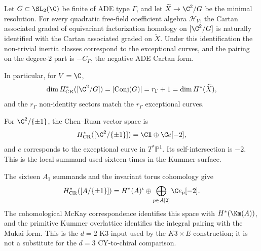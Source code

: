\begin{conjecture}
\label{conj:fh-mckay}
\ClaimStatusConjectured
Let \(G\subset \SL_2(\C)\) be finite of ADE type \(\Gamma\), and let
\(\widetilde X\to \C^2/G\) be the minimal resolution.  For every
quadratic free-field coefficient algebra \(\mathcal H_V\), the
Cartan associated graded of equivariant factorization homology on
\([\C^2/G]\) is naturally identified with the Cartan associated graded
on \(\widetilde X\).  Under this identification the non-trivial inertia
classes correspond to the exceptional curves, and the pairing on the
degree-\(2\) part is \(-C_\Gamma\), the negative ADE Cartan form.

In particular, for \(V=\C\),
\[
 \dim H^*_{\mathrm{CR}}([\C^2/G])=|\mathrm{Conj}(G)|=r_\Gamma+1
 =
 \dim H^*(\widetilde X),
\]
and the \(r_\Gamma\) non-identity sectors match the \(r_\Gamma\)
exceptional curves.
\end{conjecture}

\begin{remark}
\label{rem:fh-mckay-a1}
For \(\C^2/\{\pm1\}\), the Chen--Ruan vector space is
\[
 H^*_{\mathrm{CR}}([\C^2/\{\pm1\}])
 =
 \C\mathbf 1\oplus \C e[-2],
\]
and \(e\) corresponds to the exceptional curve in
\(T^*\mathbb P^1\).  Its self-intersection is \(-2\).  This is the
local summand used sixteen times in the Kummer surface.
\end{remark}

\begin{remark}
\label{rem:fh-mckay-kummer}
The sixteen \(A_1\) summands and the invariant torus cohomology give
\[
 H^*_{\mathrm{CR}}([A/\{\pm1\}])
 =
 H^*(A)^\iota\oplus\bigoplus_{p\in A[2]}\C e_p[-2].
\]
The cohomological McKay correspondence identifies this space with
\(H^*(\Km(A))\), and the primitive Kummer overlattice identifies the
integral pairing with the Mukai form.  This is the \(d=2\) K3 input
used by the \(K3\times E\) construction; it is not a substitute for the
\(d=3\) CY-to-chiral comparison.
\end{remark}


